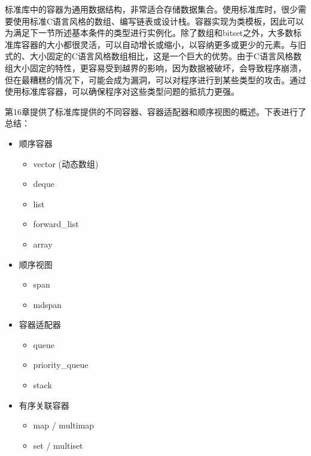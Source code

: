 
标准库中的容器为通用数据结构，非常适合存储数据集合。使用标准库时，很少需要使用标准C语言风格的数组、编写链表或设计栈。容器实现为类模板，因此可以为满足下一节所述基本条件的类型进行实例化。除了数组和bitset之外，大多数标准库容器的大小都很灵活，可以自动增长或缩小，以容纳更多或更少的元素。与旧式的、大小固定的C语言风格数组相比，这是一个巨大的优势。由于C语言风格数组大小固定的特性，更容易受到越界的影响，因为数据被破坏，会导致程序崩溃，但在最糟糕的情况下，可能会成为漏洞，可以对程序进行到某些类型的攻击。通过使用标准库容器，可以确保程序对这些类型问题的抵抗力更强。

第16章提供了标准库提供的不同容器、容器适配器和顺序视图的概述。下表进行了总结：


\begin{itemize}
\item
顺序容器
\begin{itemize}
\item
vector (动态数组)

\item
deque

\item
list

\item
forward\_list

\item
array
\end{itemize}

\item
顺序视图
\begin{itemize}
\item
span

\item
mdspan
\end{itemize}

\item
容器适配器
\begin{itemize}
\item
queue

\item
priority\_queue

\item
stack
\end{itemize}

\item
有序关联容器
\begin{itemize}
\item
map / multimap

\item
set / multiset
\end{itemize}


\end{itemize}
